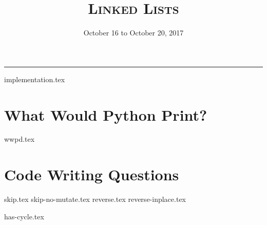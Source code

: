 \documentclass{exam}
\title{\textsc{Linked Lists}}
\date{October 16 to October 20, 2017}
\begin{document}
\maketitle
\rule{\textwidth}{0.15em}
\fontsize{12}{15}\selectfont

{implementation.tex}
\begin{questions}
\section{What Would Python Print?}
{wwpd.tex}
\section{Code Writing Questions}
{skip.tex}
{skip-no-mutate.tex}
{reverse.tex}
{reverse-inplace.tex}

\pagebreak

{has-cycle.tex}
\end{questions}
\end{document}
